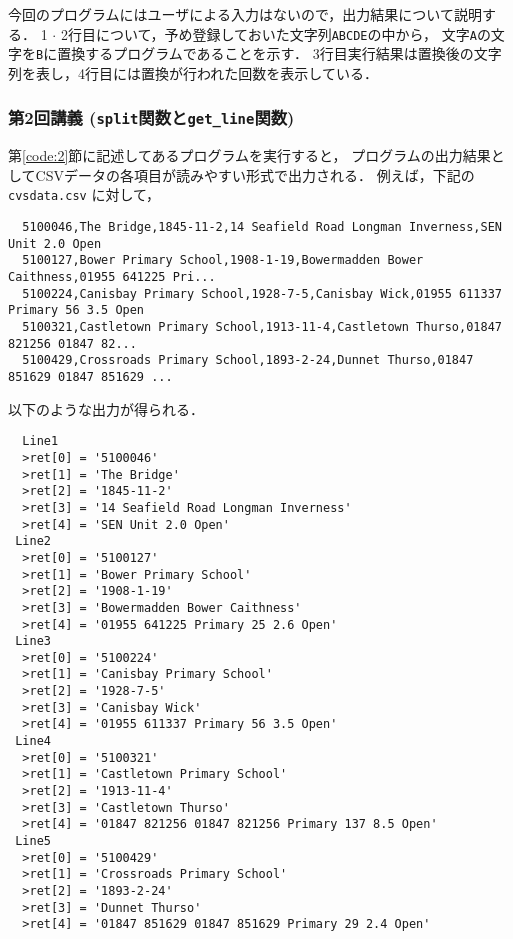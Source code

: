 \documentclass[autodetect-engine,dvi=dvipdfmx,ja=standard,
               a4j,11pt]{bxjsarticle}
\begin{document}
今回のプログラムにはユーザによる入力はないので，出力結果について説明する．
1 $\cdot$ 2行目について，予め登録しておいた文字列\verb|ABCDE|の中から，
文字\verb|A|の文字を\verb|B|に置換するプログラムであることを示す．
3行目実行結果は置換後の文字列を表し，4行目には置換が行われた回数を表示している．

\subsubsection{第2回講義 (\texttt{split}関数と\texttt{get\_line}関数)}

第\ref{code:2}節に記述してあるプログラムを実行すると，
プログラムの出力結果としてCSVデータの各項目が読みやすい形式で出力される．
例えば，下記の \verb|cvsdata.csv| に対して，

{\fontsize{10pt}{11pt} \selectfont
 \begin{verbatim}
  5100046,The Bridge,1845-11-2,14 Seafield Road Longman Inverness,SEN Unit 2.0 Open
  5100127,Bower Primary School,1908-1-19,Bowermadden Bower Caithness,01955 641225 Pri...
  5100224,Canisbay Primary School,1928-7-5,Canisbay Wick,01955 611337 Primary 56 3.5 Open
  5100321,Castletown Primary School,1913-11-4,Castletown Thurso,01847 821256 01847 82...
  5100429,Crossroads Primary School,1893-2-24,Dunnet Thurso,01847 851629 01847 851629 ...
 \end{verbatim}
}

\noindent
以下のような出力が得られる．

{\fontsize{10pt}{11pt} \selectfont
 \begin{verbatim}
  Line1
  >ret[0] = '5100046'
  >ret[1] = 'The Bridge'
  >ret[2] = '1845-11-2'
  >ret[3] = '14 Seafield Road Longman Inverness'
  >ret[4] = 'SEN Unit 2.0 Open'
 Line2
  >ret[0] = '5100127'
  >ret[1] = 'Bower Primary School'
  >ret[2] = '1908-1-19'
  >ret[3] = 'Bowermadden Bower Caithness'
  >ret[4] = '01955 641225 Primary 25 2.6 Open'
 Line3
  >ret[0] = '5100224'
  >ret[1] = 'Canisbay Primary School'
  >ret[2] = '1928-7-5'
  >ret[3] = 'Canisbay Wick'
  >ret[4] = '01955 611337 Primary 56 3.5 Open'
 Line4
  >ret[0] = '5100321'
  >ret[1] = 'Castletown Primary School'
  >ret[2] = '1913-11-4'
  >ret[3] = 'Castletown Thurso'
  >ret[4] = '01847 821256 01847 821256 Primary 137 8.5 Open'
 Line5
  >ret[0] = '5100429'
  >ret[1] = 'Crossroads Primary School'
  >ret[2] = '1893-2-24'
  >ret[3] = 'Dunnet Thurso'
  >ret[4] = '01847 851629 01847 851629 Primary 29 2.4 Open'
 \end{verbatim}
}
\end{document}
